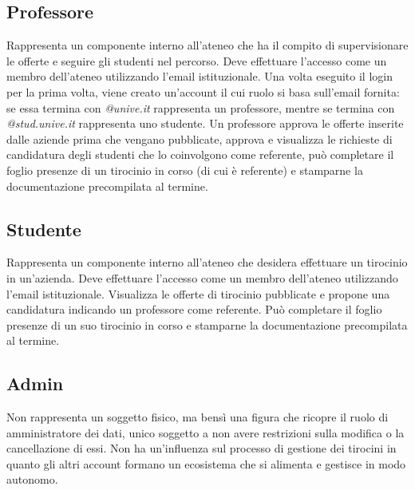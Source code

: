 \subsection{Professore}
Rappresenta un componente interno all'ateneo che ha il compito di supervisionare le offerte e seguire gli studenti nel percorso.
Deve effettuare l'accesso come un membro dell'ateneo utilizzando l'email istituzionale. Una volta eseguito il login per la prima volta, viene creato un'account il cui ruolo si basa sull'email fornita: se essa termina con \textit{@unive.it} rappresenta un professore, mentre se termina con \textit{@stud.unive.it} rappresenta uno studente. 
Un professore approva le offerte inserite dalle aziende prima che vengano pubblicate, approva e visualizza le richieste di candidatura degli studenti che lo coinvolgono come referente, può completare il foglio presenze di un tirocinio in corso (di cui è referente) e stamparne la documentazione precompilata al termine.

\subsection{Studente}
Rappresenta un componente interno all'ateneo che desidera effettuare un tirocinio in un'azienda.
Deve effettuare l'accesso come un membro dell'ateneo utilizzando l'email istituzionale. Visualizza le offerte di tirocinio pubblicate e propone una candidatura indicando un professore come referente. Può completare il foglio presenze di un suo tirocinio in corso e stamparne la documentazione precompilata al termine.

\subsection{Admin}
Non rappresenta un soggetto fisico, ma bensì una figura che ricopre il ruolo di amministratore dei dati, unico soggetto a non avere restrizioni sulla modifica o la cancellazione di essi. Non ha un'influenza sul processo di gestione dei tirocini in quanto gli altri account formano un ecosistema che si alimenta e gestisce in modo autonomo.